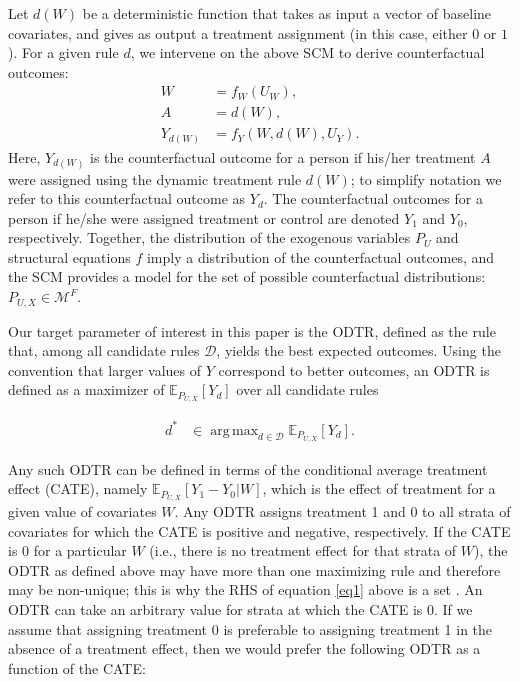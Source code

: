 \documentclass[a4paper,12pt]{article}
\DeclareMathOperator*{\argmax}{arg\,max}
\begin{document}
Let $d(W)$ be a deterministic function that takes as input a vector of baseline covariates, and gives as output a treatment assignment (in this case, either $0$ or $1$). For a given rule $d$, we intervene on the above SCM to derive counterfactual outcomes:
\begin{align*}
W&=f_W (U_W ),\\
A&=d(W), \\
Y_{d(W)}&=f_Y (W,d(W),U_Y).
\end{align*}
Here, $Y_{d(W)}$ is the counterfactual outcome for a person if his/her treatment $A$ were assigned using the dynamic treatment rule $d(W)$; to simplify notation we refer to this counterfactual outcome as $Y_d$. The counterfactual outcomes for a person if he/she were assigned treatment or control are denoted $Y_1$ and $Y_0$, respectively. Together, the distribution of the exogenous variables $P_U$ and structural equations $f$ imply a distribution of the counterfactual outcomes, and the SCM provides a model for the set of possible counterfactual distributions: $P_{U,X} \in \mathcal{M}^F$. 

Our target parameter of interest in this paper is the ODTR, defined as the rule that, among all candidate rules $\mathcal{D}$, yields the best expected outcomes. Using the convention that larger values of $Y$ correspond to better outcomes, an ODTR is defined as a maximizer of $\mathbb{E}_{P_{U,X} } [Y_d] $ over all candidate rules

\begin{align}
    d^* & \in \argmax_{d\in \mathcal{D}} \mathbb{E}_{P_{U,X} } [Y_d].
\label{eq1}
\end{align}

Any such ODTR can be defined in terms of the conditional average treatment effect (CATE), namely $\mathbb{E}_{P_{U,X}}[Y_1-Y_0|W]$, which is the effect of treatment for a given value of covariates $W$. Any ODTR assigns treatment 1 and 0 to all strata of covariates for which the CATE is positive and negative, respectively. If the CATE is 0 for a particular $W$ (i.e., there is no treatment effect for that strata of $W$), the ODTR as defined above may have more than one maximizing rule and therefore may be non-unique; this is why the RHS of equation \ref{eq1} above is a set \citep{luedtke2016statistical}. An ODTR can take an arbitrary value for strata at which the CATE is 0. If we assume that assigning treatment 0 is preferable to assigning treatment 1 in the absence of a treatment effect, then we would prefer the following ODTR as a function of the CATE:
\end{document}
